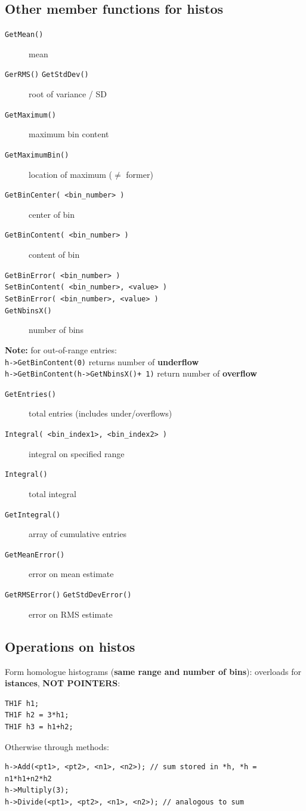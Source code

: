 \documentclass[10pt, oneside]{article}
\begin{document}
\subsection{Other member functions for histos}
\begin{description}
\item[\texttt{GetMean()}] mean
\item[\texttt{GerRMS()} \texttt{GetStdDev()}] root of variance / SD
\item[\texttt{GetMaximum()}] maximum bin content
\item[\texttt{GetMaximumBin()}] location of maximum ($\neq$ former)
\item[\texttt{GetBinCenter( <bin\_number> )}] center of bin
\item[\texttt{GetBinContent( <bin\_number> )}] content of bin
\item[\texttt{GetBinError( <bin\_number> )}]
\item[\texttt{SetBinContent( <bin\_number>, <value> )}]
\item[\texttt{SetBinError( <bin\_number>, <value> )}]
\item[\texttt{GetNbinsX()}] number of bins
\end{description}
\textbf{Note:} for out-of-range entries:
\\\texttt{h->GetBinContent(0)} returns number of \textbf{underflow}
\\\texttt{h->GetBinContent(h->GetNbinsX()+ 1)} return number of \textbf{overflow}
\begin{description}
\item[\texttt{GetEntries()}] total entries (includes under/overflows)
\item[\texttt{Integral( <bin\_index1>, <bin\_index2> )}] integral on specified range
\item[\texttt{Integral()}] total integral
\item[\texttt{GetIntegral()}] array of cumulative entries
\item[\texttt{GetMeanError()}] error on mean estimate
\item[\texttt{GetRMSError()} \texttt{GetStdDevError()}] error on RMS estimate
\end{description}

\subsection{Operations on histos}
Form homologue histograms (\textbf{same range and number of bins}): overloads for \textbf{istances}, \textbf{NOT POINTERS}:
\begin{verbatim}
TH1F h1;
TH1F h2 = 3*h1;
TH1F h3 = h1+h2;
\end{verbatim}
Otherwise through methods:
\begin{verbatim}
h->Add(<pt1>, <pt2>, <n1>, <n2>); // sum stored in *h, *h = n1*h1+n2*h2
h->Multiply(3);
h->Divide(<pt1>, <pt2>, <n1>, <n2>); // analogous to sum
\end{verbatim}
\end{document}
